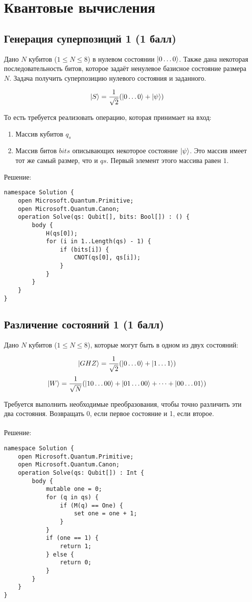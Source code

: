 \documentclass{article}
\begin{document}
\section{Квантовые вычисления}


\subsection{Генерация суперпозиций 1 (1 балл)}

Дано $N$ кубитов ($1 \le N \le 8$) в нулевом состоянии $\Ket{0\dots0}$. Также дана некоторая последовательность битов, которое задаёт ненулевое базисное состояние размера $N$. Задача получить суперпозицию нулевого состояния и заданного.

$$\Ket{S} = \frac{1}{\sqrt2}(\Ket{0\dots0} +\Ket{\psi})$$

То есть требуется реализовать операцию, которая принимает на вход:

\begin{enumerate}
    \item Массив кубитов $q_s$
    \item Массив битов $bits$ описывающих некоторое состояние $\Ket{\psi}$. Это массив имеет тот же самый размер, что и $qs$. Первый элемент этого массива равен $1$.
\end{enumerate}
Решение:
\begin{lstlisting}
namespace Solution {
    open Microsoft.Quantum.Primitive;
    open Microsoft.Quantum.Canon;
    operation Solve(qs: Qubit[], bits: Bool[]) : () {
        body { 
            H(qs[0]);
            for (i in 1..Length(qs) - 1) {
                if (bits[i]) {
                    CNOT(qs[0], qs[i]); 
                } 
            }                  
        }
    }
}
\end{lstlisting}


\subsection{Различение состояний 1 (1 балл)}

Дано $N$ кубитов ($1 \le N \le 8$), которые могут быть в одном из двух состояний:

$$\Ket{GHZ} = \frac{1}{\sqrt2}(\Ket{0\dots0} +\Ket{1\dots1})$$
$$\Ket{W} = \frac{1}{\sqrt N}(\Ket{10\dots00}+\Ket{01\dots00} + \dots +\Ket{00\dots01})$$

Требуется выполнить необходимые преобразования, чтобы точно различить эти два состояния. Возвращать $0$, если первое состояние и 1, если второе. 
\\\\
Решение:
\begin{lstlisting}
namespace Solution {
    open Microsoft.Quantum.Primitive;
    open Microsoft.Quantum.Canon;
    operation Solve(qs: Qubit[]) : Int {
        body {   
            mutable one = 0;
            for (q in qs) {
                if (M(q) == One) { 
                    set one = one + 1; 
                }
            }
            if (one == 1) {
                return 1;
            } else {
                return 0;
            }                
        }
    }
}
\end{lstlisting}
\end{document}

